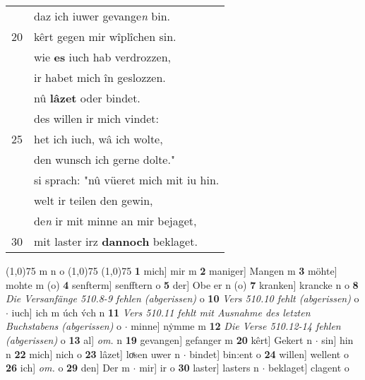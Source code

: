 \documentclass[8pt,a4paper,notitlepage]{article}
\begin{document}
\begin{table}[ht]
\begin{minipage}[t]{0.5\linewidth}
\begin{tabular}{rl}
 & daz ich iuwer gevange\textit{n} bin.\\ 
20 & kêrt gegen mir wîplîchen sin.\\ 
 & wie \textbf{es} iuch hab verdrozzen,\\ 
 & ir habet mich în geslozzen.\\ 
 & nû \textbf{lâzet} oder bindet.\\ 
 & des willen ir mich vindet:\\ 
25 & het ich iuch, wâ ich wolte,\\ 
 & den wunsch ich gerne dolte."\\ 
 & si sprach: "nû vüeret mich mit iu hin.\\ 
 & welt ir teilen den gewin,\\ 
 & de\textit{n} ir mit minne an mir bejaget,\\ 
30 & mit laster irz \textbf{dannoch} beklaget.\\ 
\end{tabular}
\scriptsize
\line(1,0){75} \newline
m n o \newline
\line(1,0){75} \newline
\newline
\line(1,0){75} \newline
\textbf{1} mich] mir m \textbf{2} maniger] Mangen m \textbf{3} möhte] mohte m (o) \textbf{4} senfterm] senfftern o \textbf{5} der] Obe er n (o) \textbf{7} kranken] krancke n o \textbf{8} \textit{Die Versanfänge 510.8-9 fehlen (abgerissen)} o  \textbf{10} \textit{Vers 510.10 fehlt (abgerissen)} o   $\cdot$ iuch] ich m úch v́ch n \textbf{11} \textit{Vers 510.11 fehlt mit Ausnahme des letzten Buchstabens (abgerissen)} o   $\cdot$ minne] nẏmme m \textbf{12} \textit{Die Verse 510.12-14 fehlen (abgerissen)} o  \textbf{13} al] \textit{om.} n \textbf{19} gevangen] gefanger m \textbf{20} kêrt] Gekert n  $\cdot$ sin] hin n \textbf{22} mich] nich o \textbf{23} lâzet] loͯsen uwer n  $\cdot$ bindet] bin:ent o \textbf{24} willen] wellent o \textbf{26} ich] \textit{om.} o \textbf{29} den] Der m  $\cdot$ mir] ir o \textbf{30} laster] lasters n  $\cdot$ beklaget] clagent o \newline
\end{minipage}
\end{table}
\newpage
\end{document}
